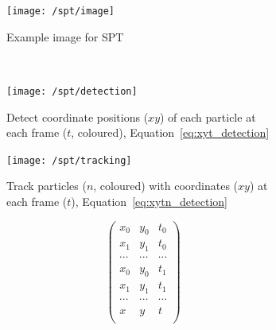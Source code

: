 
\begin{figure}
    \centering
    \begin{subfigure}[t]{0.4\linewidth}
            \centering
            \texttt{[image: /spt/image]}
            \caption{Example image for \gls{SPT}}
    \end{subfigure}\\\vspace{\abovecaptionskip}
    \begin{subfigure}[t]{0.45\linewidth}
            \centering
            \texttt{[image: /spt/detection]}
            \caption{
                Detect coordinate positions (\(xy\)) of each particle at each frame (\(t\), coloured), Equation~\eqref{eq:xyt_detection}
            }
    \end{subfigure}\quad
    \begin{subfigure}[t]{0.45\linewidth}
            \centering
            \texttt{[image: /spt/tracking]}
            \caption{
                Track particles (\(n\), coloured) with coordinates (\(xy\)) at each frame (\(t\)), Equation~\eqref{eq:xytn_detection}
            }
    \end{subfigure}
    \caption{Routine for detecting and tracking particles.}\label{fig:particle_track}
    \begin{subfigure}[t]{0.45\linewidth}
        \centering
        \begin{equation}
            \begin{pmatrix}
              x_0 & y_0 & t_0 \\
              x_1 & y_1 & t_0 \\
              \cdots & \cdots & \cdots \\
              x_0 & y_0 & t_1 \\
              x_1 & y_1 & t_1 \\
              \cdots & \cdots & \cdots \\
              x & y & t \\
          \end{pmatrix}\label{eq:xyt_detection}
        \end{equation}
    \end{subfigure}\quad
    \begin{subfigure}[t]{0.45\linewidth}
            \centering
            \begin{equation}

\end{equation}
\end{subfigure}
\end{figure}
